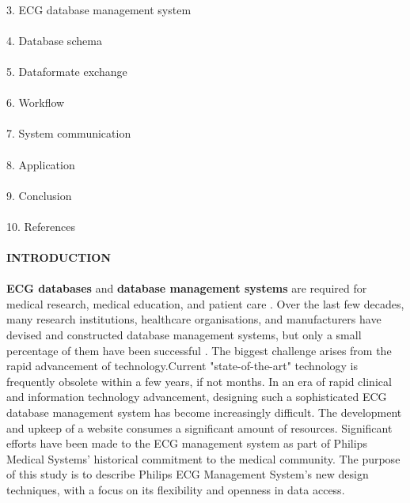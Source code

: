 \documentclass[12pt]{article}
\begin{document}
\paragraph{}3. ECG database management system
\paragraph{}4. Database schema
\paragraph{}5. Dataformate exchange
\paragraph{}6. Workflow
\paragraph{}7. System communication
\paragraph{}8. Application
\paragraph{}9. Conclusion
\paragraph{}10. References
\paragraph{\textbf{INTRODUCTION}}
\paragraph{} \textbf{ECG databases} and\textbf{ database management systems }are required for medical research, medical education, and patient care . Over the last few decades, many research institutions, healthcare organisations, and manufacturers have devised and constructed database management systems, but only a small percentage of them have been successful . The biggest challenge arises from the rapid advancement of technology.Current "state-of-the-art" technology is frequently obsolete within a few years, if not months. In an era of rapid clinical and information technology advancement, designing such a sophisticated ECG database management system has become increasingly difficult. The development and upkeep of a website consumes a significant amount of resources. Significant efforts have been made to the ECG management system as part of Philips Medical Systems' historical commitment to the medical community. The purpose of this study is to describe Philips ECG Management System's new design techniques, with a focus on its flexibility and openness in data access.
\end{document}
